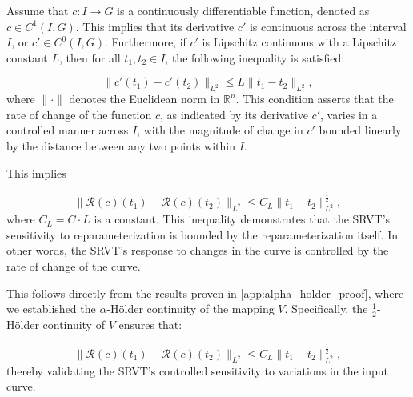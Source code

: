 Assume that \(c: I \rightarrow G\) is a continuously differentiable function, denoted as \(c \in C^1(I, G)\). This implies that its derivative \(c'\) is continuous across the interval \(I\), or \(c' \in C^0(I, G)\). Furthermore, if \(c'\) is Lipschitz continuous with a Lipschitz constant \(L\), then for all \(t_1, t_2 \in I\), the following inequality is satisfied:

\begin{equation}
\|c'(t_1) - c'(t_2)\|_{L^2} \leq L \|t_1 - t_2\|_{L^2},
\end{equation}
where \(\|\cdot\|\) denotes the Euclidean norm in \(\mathbb{R}^n\). This condition asserts that the rate of change of the function \(c\), as indicated by its derivative \(c'\), varies in a controlled manner across \(I\), with the magnitude of change in \(c'\) bounded linearly by the distance between any two points within \(I\).

This implies

\begin{equation}
    \| \mathcal{R}(c)(t_1) - \mathcal{R}(c)(t_2) \|_{L^2} \leq C_L\|t_1 - t_2\|^{\frac{1}{2}}_{L^2},
\end{equation}
where \(C_L = C \cdot L\) is a constant. This inequality demonstrates that the SRVT's sensitivity to reparameterization is bounded by the reparameterization itself. In other words, the SRVT's response to changes in the curve is controlled by the rate of change of the curve.

This follows directly from the results proven in \ref{app:alpha_holder_proof}, where we established the \(\alpha\)-Hölder continuity of the mapping \(V\). Specifically, the \(\frac{1}{2}\)-Hölder continuity of \(V\) ensures that:

\begin{equation}
    \| \mathcal{R}(c)(t_1) - \mathcal{R}(c)(t_2) \|_{L^2} \leq C_L \| t_1 - t_2 \|_{L^2}^{\frac{1}{2}},
\end{equation}
thereby validating the SRVT's controlled sensitivity to variations in the input curve.